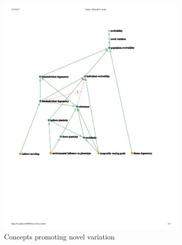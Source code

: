 \begin{figure}
 \centering
    \begin{subfigure}[b]{0.45\textwidth}
        \centering
    	\includegraphics[width=\textwidth]{img/mindmap-novel-variation}
        \caption{Concepts promoting novel variation}
        \label{subfig:heritable_variation}
    \end{subfigure}%
    \hfill
    \begin{subfigure}[b]{0.45\textwidth}
        \centering

\end{subfigure}
\end{figure}
